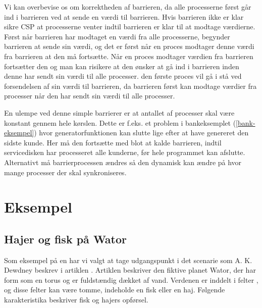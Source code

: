 Vi kan overbevise os om korrektheden af barrieren, da alle processerne først går ind i barrieren ved at sende en værdi til barrieren. Hvis barrieren ikke er klar sikre CSP at processerne venter indtil barrieren er klar til at modtage værdierne. Først når barrieren har modtaget en værdi fra alle processerne, begynder barrieren at sende sin værdi, og det er først når en proces modtager denne værdi fra barrieren at den må fortsætte. Når en proces modtager værdien fra barrieren fortsætter den og man kan risikere at den ønsker at gå ind i barrieren inden denne har sendt sin værdi til alle processer. den første proces vil gå i stå ved forsendelsen af sin værdi til barrieren, da barrieren først kan modtage værdier fra processer når den har sendt sin værdi til alle processer.

En ulempe ved denne simple barrierer er at antallet af processer skal være konstant gennem hele kørslen.
Dette er f.eks. et problem i bankeksemplet (\cref{bank-eksempel}) hvor generatorfunktionen kan slutte lige efter at have genereret den sidste kunde. Her må den fortsætte med blot at kalde barrieren, indtil servicedisken har processeret alle kunderne, før hele programmet kan afslutte. Alternativt må barrierprocessen ændres så den dynamisk kan ændre på hvor mange processer der skal synkroniseres. 


\section{Eksempel}


\subsection{Hajer og fisk på Wator} Som eksempel på en \des har vi valgt at 
tage  udgangspunkt i det scenarie som A. K. Dewdney
beskrev i artiklen \cite{wator}. Artiklen beskriver den
fiktive planet Wator, der har form som en torus og er fuldstændig
dækket af vand. Verdenen er inddelt i felter \cite[20]{wator}, og disse felter kan være tomme, indeholde en
fisk eller en haj. Følgende karakteristika beskriver fisk og hajers
opførsel.

